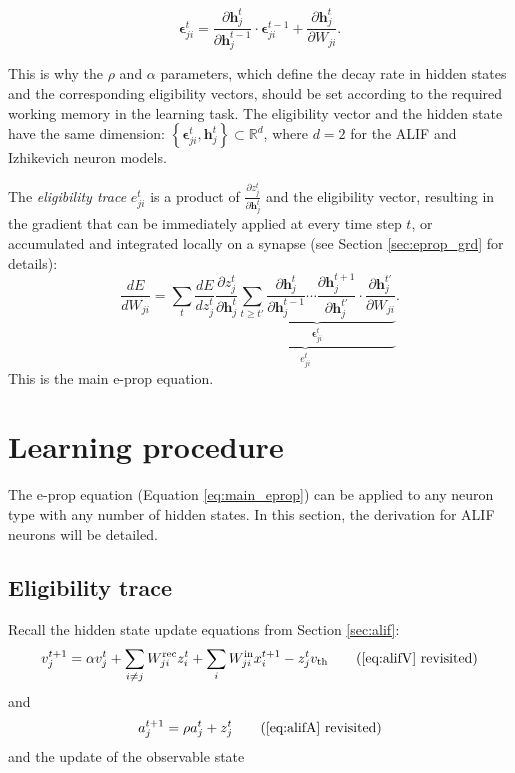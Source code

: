         \begin{equation}
        \bm{\epsilon}^t_{ji} = \frac{\partial\mathbf{h}_j^{t}}{\partial\mathbf{h}_j^{t-1}}\cdot\bm{\epsilon}^{t-1}_{ji} + \frac{\partial\mathbf{h}^t_j}{\partial W_{ji}}.
        \end{equation}

        This is why the $\rho$ and $\alpha$ parameters, which define the decay rate in hidden states and the corresponding eligibility vectors, should be set according to the required working memory in the learning task.
        The eligibility vector and the hidden state have the same dimension: $\left\{\bm{\epsilon}^t_{ji}, \mathbf{h}^t_j\right\} \subset \mathbb{R}^d$, where $d=2$ for the ALIF and Izhikevich neuron models.

        The \emph{eligibility trace} $e^t_{ji}$ is a product of $\frac{\partial z_j^t}{\partial \mathbf{h}_j^t}$ and the eligibility vector, resulting in the gradient that can be immediately applied at every time step $t$, or accumulated and integrated locally on a synapse (see Section \ref{sec:eprop_grd} for details):
        \begin{equation}\label{eq:main_eprop}
        \frac{dE}{dW_{ji}} = \sum_t\frac{dE}{dz_j^t}\underbrace{\frac{\partial z_j^t}{\partial\mathbf{h}_j^t}\underbrace{\sum_{t\geq t'}\frac{\partial\mathbf{h}^t_j}{\partial\mathbf{h}_j^{t-1}} \cdots \frac{\partial\mathbf{h}_j^{t+1}}{\partial\mathbf{h}_j^{t'}}\cdot\frac{\partial\mathbf{h}_j^{t'}}{\partial W_{ji}}}_{\bm{\epsilon}_{ji}^t}}_{e^t_{ji}}.
        \end{equation}
        This is the main e-prop equation.

    \section{Learning procedure}

        The e-prop equation (Equation \ref{eq:main_eprop}) can be applied to any neuron type with any number of hidden states.
        In this section, the derivation for ALIF neurons will be detailed.

        \subsection{Eligibility trace}
            Recall the hidden state update equations from Section \ref{sec:alif}:
            \begin{equation*}
            v^{t+1}_j = \alpha v_j^t + \sum_{i\neq j}W^\text{rec}_{ji}z_i^t + \sum_i W^\text{in}_{ji}x_i^{t+1} - z_j^tv_
            \text{th} \tag{\ref{eq:alifV} revisited}
            \end{equation*}
            and
            \begin{equation*}
            a^{t+1}_j = \rho a^t_j + z^t_j \tag{\ref{eq:alifA} revisited}
            \end{equation*}
            and the update of the observable state

